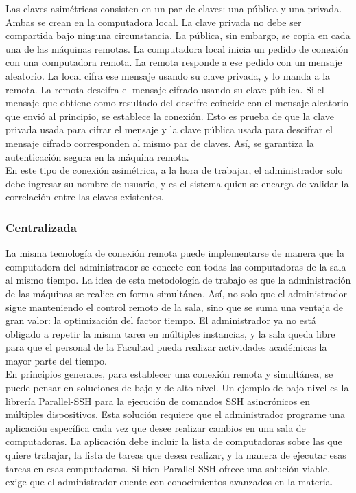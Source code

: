 \documentclass[a4paper,12pt]{article}
\begin{document}
Las claves asimétricas consisten en un par de claves: una pública y una privada. Ambas se crean en la computadora local. La clave privada no debe ser compartida bajo ninguna circunstancia. La pública, sin embargo, se copia en cada una de las máquinas remotas. La computadora local inicia un pedido de conexión con una computadora remota. La remota responde a ese pedido con un mensaje aleatorio. La local cifra ese mensaje usando su clave privada, y lo manda a la remota. La remota descifra el mensaje cifrado usando su clave pública. Si el mensaje que obtiene como resultado del descifre coincide con el mensaje aleatorio que envió al principio, se establece la conexión. Esto es prueba de que la clave privada usada para cifrar el mensaje y la clave pública usada para descifrar el mensaje cifrado corresponden al mismo par de claves. Así, se garantiza la autenticación segura en la máquina remota.\\

En este tipo de conexión asimétrica, a la hora de trabajar, el administrador solo debe ingresar su nombre de usuario, y es el sistema quien se encarga de validar la correlación entre las claves existentes.\\

\subsubsection{Centralizada}
\label{sec:orgheadline9}

La misma tecnología de conexión remota puede implementarse de manera que la computadora del administrador se conecte con todas las computadoras de la sala al mismo tiempo. La idea de esta metodología de trabajo es que la administración de las máquinas se realice en forma simultánea. Así, no solo que el administrador sigue manteniendo el control remoto de la sala, sino que se suma una ventaja de gran valor: la optimización del factor tiempo. El administrador ya no está obligado a repetir la misma tarea en múltiples instancias, y la sala queda libre para que el personal de la Facultad pueda realizar actividades académicas la mayor parte del tiempo.\\

En principios generales, para establecer una conexión remota y simultánea, se puede pensar en soluciones de bajo y de alto nivel. Un ejemplo de bajo nivel es la librería Parallel-SSH para la ejecución de comandos SSH asincrónicos en múltiples dispositivos. Esta solución requiere que el administrador programe una aplicación específica cada vez que desee realizar cambios en una sala de computadoras. La aplicación debe incluir la lista de computadoras sobre las que quiere trabajar, la lista de tareas que desea realizar, y la manera de ejecutar esas tareas en esas computadoras. Si bien Parallel-SSH ofrece una solución viable, exige que el administrador cuente con conocimientos avanzados en la materia.\\
\end{document}
